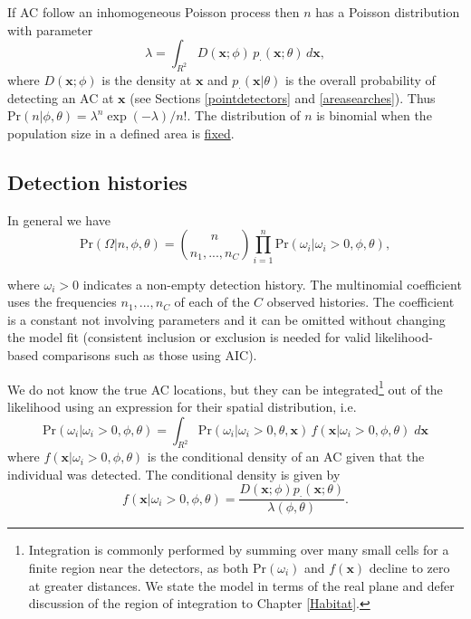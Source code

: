 \documentclass[
]{book}
\begin{document}
If AC follow an inhomogeneous Poisson process then \(n\) has a Poisson distribution with parameter
\begin{equation}
\lambda = \int_{R^2} D(\mathbf{x}; \phi) \, p_\cdot(\mathbf{x};\theta) \, d\mathbf{x}, 
\label{eq:n}
\end{equation}
where \(D(\mathbf{x}; \phi)\) is the density at \(\mathbf{x}\) and \(p_\cdot(\mathbf{x}|\theta)\) is the overall probability of detecting an AC at \(\mathbf{x}\) (see Sections \ref{pointdetectors} and \ref{areasearches}). Thus \(\mbox{Pr}(n | \phi, \theta) = \lambda^n \exp (-\lambda) / n!\). The distribution of \(n\) is binomial when the population size in a defined area is \hyperref[fixedN]{fixed}.

\subsection{Detection histories}\label{Pr-omega}

In general we have
\begin{equation}
\mbox{Pr} (\Omega | n, \phi, \theta) = \binom {n}{n_1,...,n_C}
\prod_{i=1}^n \mbox{Pr}( \omega_i | \omega_i>0, \phi, \theta),
 \label{eq:CL}
\end{equation}

where \(\omega_i>0\) indicates a non-empty detection history. The multinomial coefficient uses the frequencies \(n_1,...,n_C\) of each of the \(C\) observed histories. The coefficient is a constant not involving parameters and it can be omitted without changing the model fit (consistent inclusion or exclusion is needed for valid likelihood-based comparisons such as those using AIC).

We do not know the true AC locations, but they can be integrated\footnote{Integration is commonly performed by summing over many small cells for a finite region near the detectors, as both \(\mbox{Pr}(\omega_i)\) and \(f(\mathbf{x})\) decline to zero at greater distances. We state the model in terms of the real plane and defer discussion of the region of integration to Chapter \ref{Habitat}.} out of the likelihood using an expression for their spatial distribution, i.e.
\begin{equation}
\mbox{Pr}( \omega_i | \omega_i>0, \phi, \theta) = \int_{R^2} \mbox{Pr}( \omega_i | \omega_i>0, \theta, \mathbf{x}) \, f(\mathbf{x} | \omega_i>0, \phi, \theta) \; d\mathbf{x}
\label{eq:omegai}
\end{equation}
where \(f(\mathbf{x}| \omega_i>0, \phi, \theta)\) is the conditional density of an AC given that the individual was detected. The conditional density is given by
\begin{equation}
f(\mathbf{x}| \omega_i>0, \phi, \theta) = \frac{D(\mathbf{x} ; \phi) p_\cdot(\mathbf{x} ; \theta)}{\lambda(\phi,\theta)}.
\label{eq:f}
\end{equation}
\end{document}
